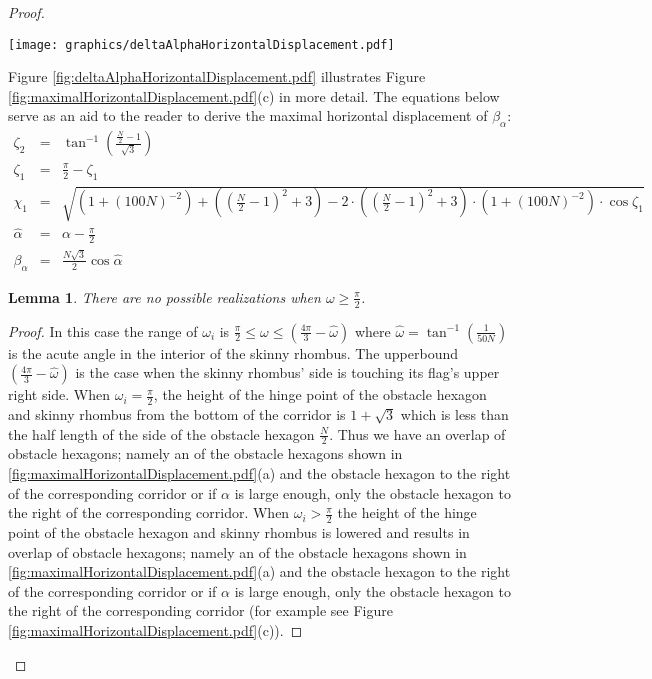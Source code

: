 \documentclass[10pt]{CSUNthesis}
\theoremstyle{plain}%
\newtheorem{lem}{Lemma}
\theoremstyle{definition}
\theoremstyle{remark}
\newcommand{\lr}[1]{\left( #1 \right)}
\begin{document}
\begin{proof}
\begin{minipage}{\linewidth}
\begin{center}
\texttt{[image: graphics/deltaAlphaHorizontalDisplacement.pdf]}
\label{fig:deltaAlphaHorizontalDisplacement.pdf}
\end{center}
\end{minipage}

Figure \ref{fig:deltaAlphaHorizontalDisplacement.pdf} illustrates Figure \ref{fig:maximalHorizontalDisplacement.pdf}(c) in more detail.  
The equations below serve as an aid to the reader to derive the maximal horizontal displacement of $\beta_\alpha$:
$$
\begin{array}{rcl}
\zeta_2 &=& \tan^{-1} \lr{\frac{\frac{N}{2}-1}{\sqrt{3}}}\\
\zeta_1 &=& \frac{\pi}{2} - \zeta_1\\
\chi_1 &=& \sqrt{\lr{1+(100N)^{-2}} + \lr{\lr{\frac{N}{2}-1}^2 + 3} - 2 \cdot \lr{\lr{\frac{N}{2}-1}^2 + 3}\cdot \lr{1+(100N)^{-2}}  \cdot \cos \zeta_1       }\\
\hat{\alpha} &=& \alpha - \frac{\pi}{2}\\
\beta_\alpha &=& \frac{N\sqrt{3}}{2} \cos \hat{\alpha}
\end{array}
$$

\begin{lem}\label{lem:Omega}
There are no possible realizations when $\omega \geq \frac{\pi}{2}$.
\end{lem}
\begin{proof}
In this case the range of $\omega_i$ is $\frac{\pi}{2} \leq \omega \leq \lr{\frac{4 \pi}{3} - \hat{\omega}}$ where $\hat{\omega} = \tan^{-1} \lr{\frac{1}{50N}}$ is the acute angle in the interior of the skinny rhombus.  
The upperbound $\lr{\frac{4 \pi}{3} - \hat{\omega}}$ is the case when the skinny rhombus' side is touching its flag's upper right side.  
When $\omega_i = \frac{\pi}{2}$, the height of the hinge point of the obstacle hexagon and skinny rhombus from the bottom of the corridor is $1 + \sqrt{3}$ which is less than the half length of the side of the obstacle hexagon $\frac{N}{2}$.  
Thus we have an overlap of obstacle hexagons; namely an of the obstacle hexagons shown in \ref{fig:maximalHorizontalDisplacement.pdf}(a) and the obstacle hexagon to the right of the corresponding corridor or if $\alpha$ is large enough, only the obstacle hexagon to the right of the corresponding corridor.
When $\omega_i > \frac{\pi}{2}$ the height of the hinge point of the obstacle hexagon and skinny rhombus is lowered and results in overlap of obstacle hexagons; namely an of the obstacle hexagons shown in \ref{fig:maximalHorizontalDisplacement.pdf}(a) and the obstacle hexagon to the right of the corresponding corridor or if $\alpha$ is large enough, only the obstacle hexagon to the right of the corresponding corridor (for example see Figure \ref{fig:maximalHorizontalDisplacement.pdf}(c)).
\end{proof}


\end{proof}
\end{document}
